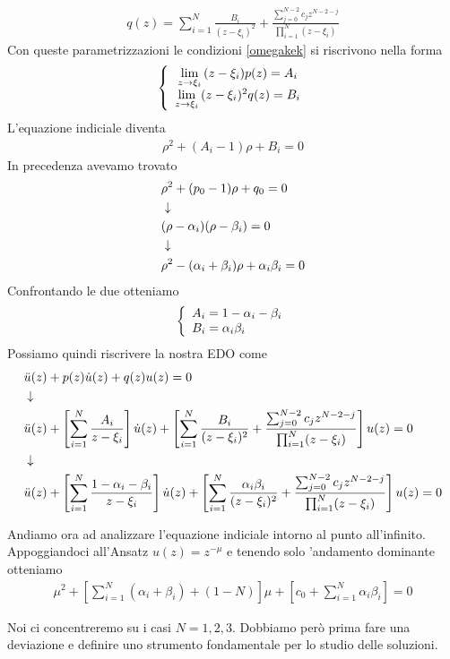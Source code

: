 \begin{align}
	q(z) = \sum_{i=1}^{N} \frac{B_i}{(z-\xi_i)^2} +  \frac{\sum_{j=0}^{N-2} c_j z^{N-2-j} }{\prod_{i=1}^{N}(z-\xi_i)}
\end{align}
Con queste parametrizzazioni le condizioni \ref{omegakek} si riscrivono nella forma
\begin{align}
	\left\{ \begin{array}{cc} \underset{z \rightarrow \xi_i}{\lim} \, (z-\xi_i)p(z) = A_i\\ \underset{z \rightarrow \xi_i}{\lim} \, (z-\xi_i)^2 q(z)= B_i \end{array} \right.
\end{align}
L'equazione indiciale diventa
\begin{align}
	\rho^2 + (A_i -1)\rho + B_i = 0
\end{align}
In precedenza avevamo trovato
\begin{align}
	&\rho^2 + (p_0 -1)\rho + q_0 = 0 \\ &\downarrow \nonumber \\
	&(\rho- \alpha_i)(\rho- \beta_i) = 0 \nonumber \\ &\downarrow \nonumber \\
	&\rho^2 - (\alpha_i + \beta_i) \rho +\alpha_i\beta_i = 0
\end{align}
Confrontando le due otteniamo
\begin{align}
	\double{ A_i =  1 - \alpha_i - \beta_i}{B_i = \alpha_i\beta_i \hfill}
\end{align}
Possiamo quindi riscrivere la nostra EDO come
\begin{align}
	&\ddot{u}(z) + p(z)\dot{u}(z) + q(z)u(z) = 0\\ &\downarrow \nonumber \\
	&\ddot{u}(z) + \left[ \sum_{i=1}^{N} \frac{A_i}{z-\xi_i} \right] \dot{u}(z) + \left[ \sum_{i=1}^{N} \frac{B_i}{(z-\xi_i)^2} +  \frac{\sum_{j=0}^{N-2} c_j z^{N-2-j} }{\prod_{i=1}^{N}(z-\xi_i)} \right] u(z) = 0\nonumber \\ &\downarrow \nonumber \\
	&\ddot{u}(z) + \left[ \sum_{i=1}^{N} \frac{1 - \alpha_i - \beta_i}{z-\xi_i} \right] \dot{u}(z) + \left[ \sum_{i=1}^{N} \frac{\alpha_i\beta_i}{(z-\xi_i)^2} +  \frac{\sum_{j=0}^{N-2} c_j z^{N-2-j} }{\prod_{i=1}^{N}(z-\xi_i)} \right] u(z) = 0
\end{align}

Andiamo ora ad analizzare l'equazione indiciale intorno al punto all'infinito. Appoggiandoci all'Ansatz $u(z) = z^{-\mu}$ e tenendo solo 'andamento dominante otteniamo
\begin{align}
	\mu^2 + \left[ \sum_{i=1}^{N} (\alpha_i + \beta_i) + (1-N) \right]\mu + \left[ c_0 + \sum_{i=1}^{N}\alpha_i \beta_i \right] = 0
\end{align}

Noi ci concentreremo su i casi $N=1,2,3$. Dobbiamo però prima fare una deviazione e definire uno strumento fondamentale per lo studio delle soluzioni.


